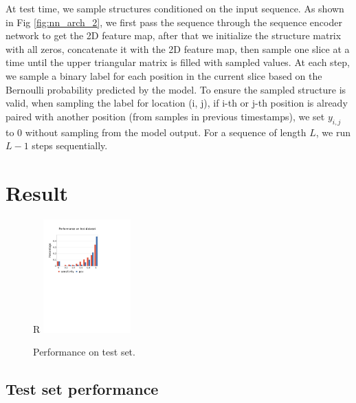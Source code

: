\documentclass{article}
\begin{document}
At test time, we sample structures conditioned on the input sequence.
As shown in Fig \ref{fig:nn_arch_2}, we first pass the sequence through the
sequence encoder network to get the 2D feature map, after that
we initialize the structure matrix with all zeros, concatenate it with the 2D feature map,
then sample one slice at a time until the upper triangular matrix is filled with sampled values.
At each step, we sample a binary label for each position in the current slice based on the
Bernoulli probability predicted by the model.
To ensure the sampled structure is valid, when sampling the label for location (i, j),
if i-th or j-th position is already paired with another position (from samples in previous timestamps),
 we set $y_{i, j}$ to $0$ without sampling from the model output.
For a sequence of length $L$, we run $L-1$ steps sequentially.




\section{Result}


\begin{figure}{R}
    \centering
    \includegraphics[width=0.3\textwidth]{plot/performance_test_set.pdf}
    \caption{Performance on test set.}
    \label{fig:performance_test_set}
    \centering
\end{figure}

\subsection{Test set performance}
\end{document}
